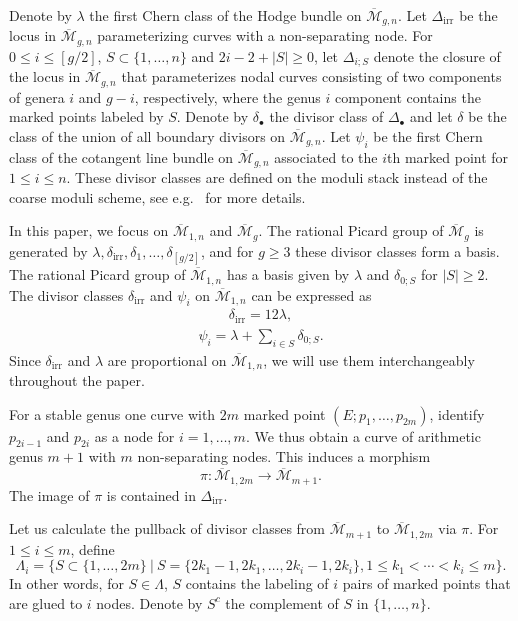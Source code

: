 \documentclass[11]{amsart}
\theoremstyle{plain}
\theoremstyle{definition}
\newcommand{\BM}{\overline{\mathcal M}}
\newcommand{\irr}{\operatorname{irr}}
\begin{document}
Denote by $\lambda$ the first Chern class of the Hodge bundle on $\BM_{g,n}$. Let $\Delta_{\irr}$ be the locus in $\BM_{g,n}$ parameterizing curves with a non-separating node. 
For $0\leq i \leq [g/2]$, $S\subset \{1,\ldots, n \}$ and $2i -2 + |S| \geq 0$, let $\Delta_{i;S}$ denote the closure of the locus in $\BM_{g,n}$ that parameterizes nodal curves consisting of two components of genera $i$ and $g-i$, respectively, where
the genus $i$ component contains the marked points labeled by $S$. Denote by $\delta_{\bullet}$ the divisor class of $\Delta_{\bullet}$ and  
let $\delta$ be the class of the union of all boundary divisors on $\BM_{g,n}$. 
Let $\psi_i$ be the first Chern class of the cotangent line bundle on $\BM_{g,n}$ associated to the $i$th marked point for $1\leq i \leq n$. 
These divisor classes are defined on the moduli stack instead of the coarse moduli scheme, see e.g.~\cite{ArbarelloCornalba, HarrisMorrison} for more details.

In this paper, we focus on $\BM_{1,n}$ and $\BM_g$. The rational Picard group of 
$\BM_g$ is generated by $\lambda, \delta_{\irr}, \delta_1, \ldots, \delta_{[g/2]}$, and for $g\geq 3$ these divisor classes 
form a basis. The rational Picard group of $\BM_{1,n}$ has a basis given by $\lambda$ and $\delta_{0;S}$ for $|S| \geq 2$. The divisor classes $\delta_{\irr}$ and $\psi_i$ on $\BM_{1,n}$
can be expressed as 
\begin{eqnarray}
\label{eqn:delta}
\delta_{\irr} = 12 \lambda, 
\end{eqnarray}
\begin{eqnarray}
\label{eqn:psi}
\psi_i = \lambda + \sum_{i\in S} \delta_{0;S}.
\end{eqnarray}
Since $\delta_{\irr}$ and $\lambda$ are proportional on $\BM_{1,n}$, we will use them interchangeably throughout the paper.  
 
For a stable genus one curve with $2m$ marked point $(E; p_1, \ldots, p_{2m})$, identify 
$p_{2i-1}$ and $p_{2i}$ as a node for $i= 1, \ldots, m$. We thus obtain a curve of 
arithmetic genus $m+1$ with $m$ non-separating nodes. This induces a morphism 
$$\pi: \BM_{1, 2m}\to \BM_{m+1}. $$
The image of $\pi$ is contained in $\Delta_{\irr}$. 

Let us calculate the pullback of divisor classes from $\BM_{m+1}$ to $\BM_{1,2m}$ via $\pi$. For $1\leq i \leq m$, define
$$\Lambda_i = \{ S\subset \{1,\ldots,2m\} \ | \ S = \{2k_1-1, 2k_1, \ldots, 2k_i-1, 2k_i\}, 1\leq k_1 < \cdots < k_i \leq m \}. $$
In other words, for $S\in \Lambda$, $S$ contains the labeling of $i$ pairs of marked points that are glued to $i$ nodes. 
Denote by $S^c$ the complement of $S$ in $\{ 1, \ldots, n  \}$. 
\end{document}
